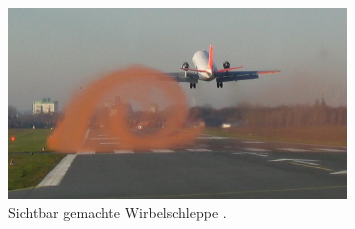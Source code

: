 \begin{figure}
\centering
\includegraphics[width=0.8\textwidth]{papers/wirbelringe/fig/visualisierung_einer_wirbelschleppe.jpg}
\caption{Sichtbar gemachte Wirbelschleppe 
\cite{Wirbelringe:visualisierung_einer_wirbelschleppe}. \label{Wirbelringe:fig:visualisierung_einer_wirbelschleppe}}
\end{figure}